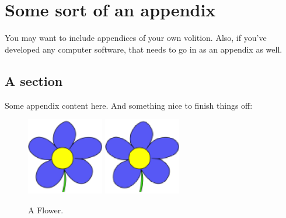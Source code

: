 \chapter{Some sort of an appendix}
\label{appendix:somesort}

You may want to include appendices of your own volition. Also, if you've developed any computer software, that needs to go in as an appendix as well.

\section{A section}

Some appendix content here. And something nice to finish things off:

\begin{figure}[htb]
  \centering
  \ifpdf
    \includegraphics[width=0.3\textwidth]{graphics/mygraphic2.png}
  \else
    \includegraphics[width=0.3\textwidth]{graphics/mygraphic2-for-ps.eps}
  \fi
  \caption{A Flower.}
\end{figure}

